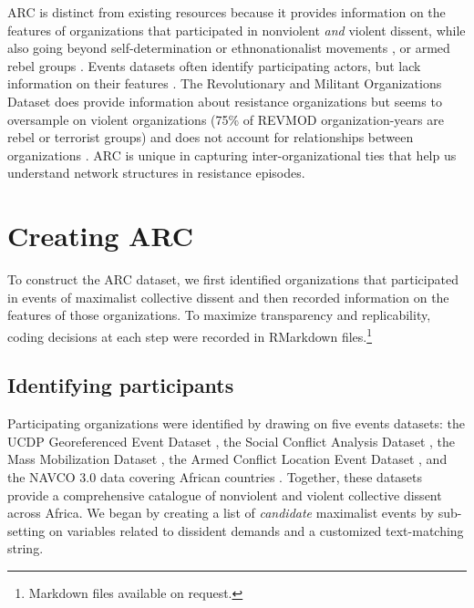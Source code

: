 ARC is distinct from existing resources because it provides information on the features of organizations that participated in nonviolent \textit{and} violent dissent, while also going beyond self-determination or ethnonationalist movements \citep{Wilkenfeld2011, Cunningham2020}, or armed rebel groups \citep{Pettersson2020a, Harbom2008, Braithwaite2020, Stewart2018, Cunningham2013, Svensson2018, Cunningham2009a}. Events datasets often identify participating actors, but lack information on their features \citep{Chenoweth2018, Chenoweth2019b, Salehyan2012, Clark2021, Raleigh2010, Chenoweth2019b}. The Revolutionary and Militant Organizations Dataset does provide information about resistance organizations but seems to oversample on violent organizations (75\% of REVMOD organization-years are rebel or terrorist groups) and does not account for relationships between organizations \citep{Acosta2019}. ARC is unique in capturing inter-organizational ties that help us understand network structures in resistance episodes. 


\section{Creating ARC}

To construct the ARC dataset, we first identified organizations that participated in events of maximalist collective dissent and then recorded information on the features of those organizations. To maximize transparency and replicability, coding decisions at each step were recorded in RMarkdown files.\footnote{Markdown files available on request.}

\subsection{Identifying participants}

Participating organizations were identified by drawing on five events datasets: the UCDP Georeferenced Event Dataset \citep{Sundberg2013}, the Social Conflict Analysis Dataset \citep{Salehyan2012}, the Mass Mobilization Dataset \citep{Clark2021}, the Armed Conflict Location Event Dataset \citep{Raleigh2010}, and the NAVCO 3.0 data covering African countries \citep{Chenoweth2018}. Together, these datasets provide a comprehensive catalogue of nonviolent and violent collective dissent across Africa. We began by creating a list of \emph{candidate} maximalist events by sub-setting on variables related to dissident demands and a customized text-matching string. 

